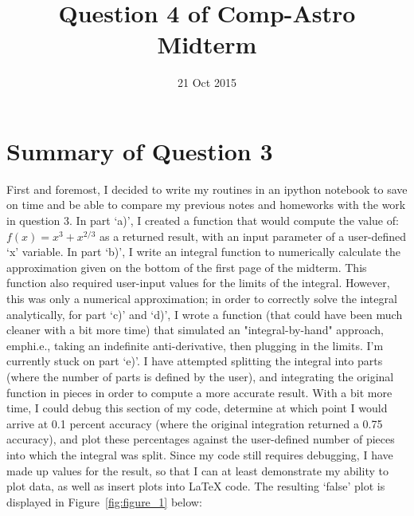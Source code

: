 \documentclass{article}
\begin{document}
\title{\vspace{-10mm}\bf{\Large{Question 4 of Comp-Astro Midterm}}}
\author{}
\date{21 Oct 2015}
\maketitle

\vspace{5mm}
\section{Summary of Question 3}

First and foremost, I decided to write my routines in an ipython notebook to save on time and be able to compare my previous notes and homeworks with the work in question 3. In part `a)', I created a function that would compute the value of: $f(x) = x^{3} + x^{2/3}$ as a returned result, with an input parameter of a user-defined `x' variable. In part `b)', I write an integral function to numerically calculate the approximation given on the bottom of the first page of the midterm. This function also required user-input values for the limits of the integral. However, this was only a numerical approximation; in order to correctly solve the integral analytically, for part `c)' and `d)', I wrote a function (that could have been much cleaner with a bit more time) that simulated an "integral-by-hand" approach, emph{i.e.}, taking an indefinite anti-derivative, then plugging in the limits. I'm currently stuck on part `e)'. I have attempted splitting the integral into parts (where the number of parts is defined by the user), and integrating the original function in pieces in order to compute a more accurate result. With a bit more time, I could debug this section of my code, determine at which point I would arrive at 0.1 percent accuracy (where the original integration returned a 0.75 accuracy), and plot these percentages against the user-defined number of pieces into which the integral was split.
\linebreak
\linebreak
Since my code still requires debugging, I have made up values for the result, so that I can at least demonstrate my ability to plot data, as well as insert plots into LaTeX code. The resulting `false' plot is displayed in Figure~\ref{fig:figure_1} below:
\end{document}
